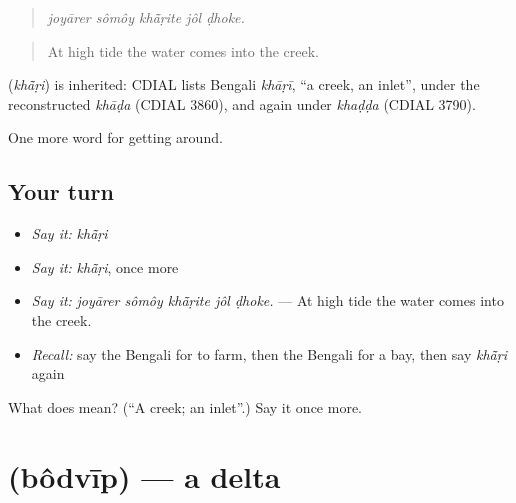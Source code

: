 \begin{quote}
    
\end{quote}

\begin{quote}
\emph{joyārer sômôy khā̃ṛite jôl ḍhoke.}
\end{quote}

\begin{quote}
At high tide the water comes into the creek.
\end{quote}

\begin{cousinweb}
\textbf{} (\emph{khā̃ṛi}) is inherited: CDIAL lists Bengali \emph{khāṛī}, \textquotedblleft{}a creek, an inlet\textquotedblright{}, under the reconstructed \emph{khāḍa} (CDIAL 3860), and again under \emph{khaḍḍa} (CDIAL 3790).
\end{cousinweb}

\begin{grammarlens}[title={What you've built}]
One more word for getting around.
\end{grammarlens}

\subsection*{Your turn}
\begin{itemize}
\raggedright
  \item \emph{Say it:} \emph{khā̃ṛi}
  \item \emph{Say it:} \emph{khā̃ṛi}, once more
  \item \emph{Say it:} \emph{joyārer sômôy khā̃ṛite jôl ḍhoke.} — At high tide the water comes into the creek.
  \item \emph{Recall:} say the Bengali for to farm, then the Bengali for a bay, then say \emph{khā̃ṛi} again
\end{itemize}

\begin{tcolorbox}[breakable,colback=teal!4,colframe=teal!35!black,title={Before you move on}]
What does  mean? (\textquotedblleft{}A creek; an inlet\textquotedblright{}.) Say it once more.
\end{tcolorbox}
\section[\texorpdfstring{\bn{বদ্বীপ} (bôdvīp)}{বদ্বীপ (bôdvīp)}]{ (bôdvīp) — a delta}

